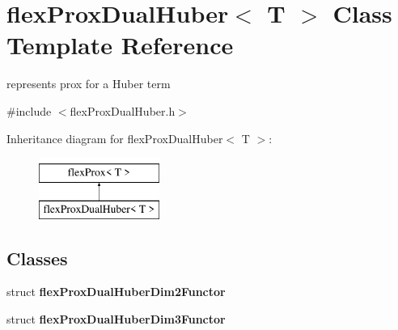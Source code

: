 \hypertarget{classflex_prox_dual_huber}{}\section{flex\+Prox\+Dual\+Huber$<$ T $>$ Class Template Reference}
\label{classflex_prox_dual_huber}


represents prox for a Huber term  




{\ttfamily \#include $<$flex\+Prox\+Dual\+Huber.\+h$>$}

Inheritance diagram for flex\+Prox\+Dual\+Huber$<$ T $>$\+:\begin{figure}[H]
\begin{center}
\leavevmode
\includegraphics[height=2.000000cm]{classflex_prox_dual_huber}
\end{center}
\end{figure}
\subsection*{Classes}
\begin{DoxyCompactItemize}
\item 
struct {\bfseries flex\+Prox\+Dual\+Huber\+Dim2\+Functor}
\item 
struct {\bfseries flex\+Prox\+Dual\+Huber\+Dim3\+Functor}
\end{DoxyCompactItemize}

